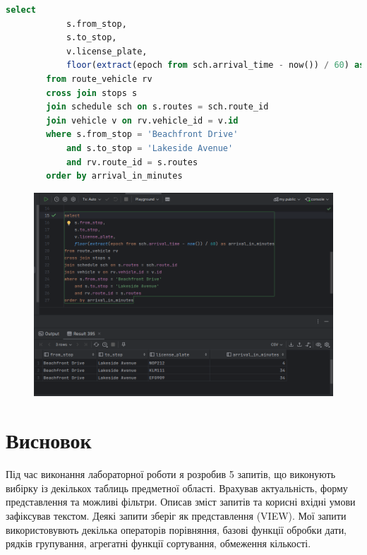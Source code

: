 \documentclass[14pt]{extreport}
\begin{document}
\begin{normalsize}
\begin{lstlisting}[language=sql]
		select
			s.from_stop,
			s.to_stop,
			v.license_plate,
			floor(extract(epoch from sch.arrival_time - now()) / 60) as arrival_in_minutes
		from route_vehicle rv
		cross join stops s
		join schedule sch on s.routes = sch.route_id
		join vehicle v on rv.vehicle_id = v.id
		where s.from_stop = 'Beachfront Drive'
			and s.to_stop = 'Lakeside Avenue'
			and rv.route_id = s.routes
		order by arrival_in_minutes
	\end{lstlisting}
	\fi
	\begin{figure}[H]
		\centering
		\includegraphics[scale=0.5]{4}
		\caption{}
	\end{figure}
	\section*{Висновок}
	Під час виконання лабораторної роботи я розробив 5 запитів, що виконують вибірку із декількох таблиць предметної області. Врахував актуальність, форму представлення та можливі фільтри. Описав зміст запитів та корисні вхідні умови зафіксував текстом. Деякі запити зберіг як представлення (VIEW).
	Мої запити використовувють декілька операторів порівняння, базові функції обробки дати, рядків групування, агрегатні функції сортування, обмеження кількості.
	 
\end{normalsize}
\end{document}
